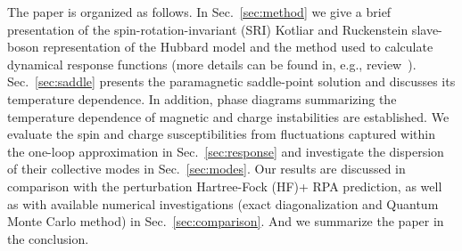 \documentclass[showpacs,amsmath,twocolumn,floatfix]{revtex4-1}
\begin{document}
The paper is organized as follows. In Sec.~\ref{sec:method} we give a 
brief presentation of the spin-rotation-invariant (SRI) Kotliar and 
Ruckenstein slave-boson representation of the Hubbard model and the method 
used to calculate dynamical response functions (more details can be found 
in, e.g., review~\cite{fresard12}). Sec.~\ref{sec:saddle} presents the 
paramagnetic saddle-point solution and discusses its temperature 
dependence. In addition, phase diagrams summarizing the temperature dependence
of magnetic and charge instabilities are established. We evaluate the spin and 
charge susceptibilities from fluctuations captured within the one-loop 
approximation in Sec.~\ref{sec:response} and investigate the dispersion of their 
collective modes in Sec.~\ref{sec:modes}. Our results are discussed in comparison 
with the perturbation Hartree-Fock (HF)+ RPA prediction, as well as with available 
numerical investigations (exact diagonalization and Quantum  Monte Carlo method) 
in Sec.~\ref{sec:comparison}. And we summarize the paper in the conclusion. 
\end{document}
